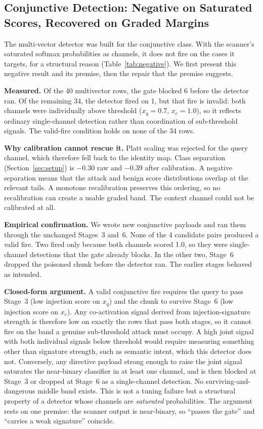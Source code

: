 \documentclass[conference]{IEEEtran}
\begin{document}
\subsection{Conjunctive Detection: Negative on Saturated Scores, Recovered on Graded Margins}\label{sec:negative}
The multi-vector detector was built for the conjunctive class. With the scanner's saturated softmax probabilities as channels, it does not fire on the cases it targets, for a structural reason (Table~\ref{tab:negative}). We first present this negative result and its premise, then the repair that the premise suggests.

\textbf{Measured.} Of the 40 multivector rows, the gate blocked 6 before the detector ran. Of the remaining 34, the detector fired on 1, but that fire is invalid: both channels were individually above threshold ($x_q=0.7$, $x_c=1.0$), so it reflects ordinary single-channel detection rather than coordination of sub-threshold signals. The valid-fire condition holds on none of the 34 rows.

\textbf{Why calibration cannot rescue it.} Platt scaling was rejected for the query channel, which therefore fell back to the identity map. Class separation (Section~\ref{sec:setup}) is $-0.30$ raw and $-0.39$ after calibration. A negative separation means that the attack and benign score distributions overlap at the relevant tails. A monotone recalibration preserves this ordering, so no recalibration can create a usable graded band. The context channel could not be calibrated at all.

\textbf{Empirical confirmation.} We wrote new conjunctive payloads and ran them through the unchanged Stages~3 and~6. None of the 4 candidate pairs produced a valid fire. Two fired only because both channels scored 1.0, so they were single-channel detections that the gate already blocks. In the other two, Stage~6 dropped the poisoned chunk before the detector ran. The earlier stages behaved as intended.

\textbf{Closed-form argument.} A valid conjunctive fire requires the query to pass Stage~3 (low injection score on $x_q$) and the chunk to survive Stage~6 (low injection score on $x_c$). Any co-activation signal derived from injection-signature strength is therefore low on exactly the rows that pass both stages, so it cannot fire on the band a genuine sub-threshold attack must occupy. A high joint signal with both individual signals below threshold would require measuring something other than signature strength, such as semantic intent, which this detector does not. Conversely, any directive payload strong enough to raise the joint signal saturates the near-binary classifier in at least one channel, and is then blocked at Stage~3 or dropped at Stage~6 as a single-channel detection. No surviving-and-dangerous middle band exists. This is not a tuning failure but a structural property of a detector whose channels are \emph{saturated} probabilities. The argument rests on one premise: the scanner output is near-binary, so ``passes the gate'' and ``carries a weak signature'' coincide.
\end{document}

